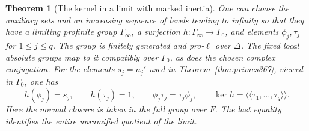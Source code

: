 \documentclass[a4paper,11pt]{article}
\newtheorem{theorem}[proposition]{Theorem}
\theoremstyle{definition}
\theoremstyle{remark}
\numberwithin{equation}{section}
\begin{document}
\begin{theorem}[The kernel in a limit with marked inertia]\leavevmode
\label{thm:limitkernel407}
One can choose the auxiliary sets and an increasing sequence
of levels tending to infinity so that they have a limiting
profinite group \(\Gamma_\infty\), a surjection
\(h:\Gamma_\infty\to\Gamma_0\), and elements
\(\phi_j,\tau_j\) for \(1\le j\le q\). The group is finitely
generated and pro-\(\ell\) over \(\Delta\). The fixed local
absolute groups map to it compatibly over \(\Gamma_0\), as
does the chosen complex conjugation. For the elements
\(s_j=n_j'\) used in Theorem~\ref{thm:primes367}, viewed in
\(\Gamma_0\), one has
\[
 h(\phi_j)=s_j,\qquad h(\tau_j)=1,\qquad
 \phi_j\tau_j=\tau_j\phi_j,\qquad
 \ker h=\overline{\langle\!\langle\tau_1,\dots,\tau_q
                                           \rangle\!\rangle}.
\]
Here the normal closure is taken in the full group over \(F\).
The last equality identifies the entire unramified quotient
of the limit.
\end{theorem}
\end{document}
